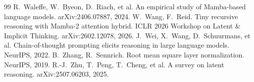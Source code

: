 \documentclass[10pt]{article}
\begin{document}
\begin{thebibliography}{99}
 R.~Waleffe, W.~Byeon, D.~Riach, et al. An empirical study of Mamba-based language models. arXiv:2406.07887, 2024.
 W.~Wang, F.~Reid. Tiny recursive reasoning with Mamba-2 attention hybrid. ICLR 2026 Workshop on Latent \& Implicit Thinking. arXiv:2602.12078, 2026.
 J.~Wei, X.~Wang, D.~Schuurmans, et al. Chain-of-thought prompting elicits reasoning in large language models. NeurIPS, 2022.
 B.~Zhang, R.~Sennrich. Root mean square layer normalization. NeurIPS, 2019.
 R.-J.~Zhu, T.~Peng, T.~Cheng, et al. A survey on latent reasoning. arXiv:2507.06203, 2025.
\end{thebibliography}
\end{document}
